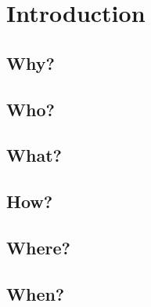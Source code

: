 \chapter{Introduction}
\label{chapter:introduction}

\section{Why?}

\section{Who?}

\section{What?}

\section{How?}

\section{Where?}

\section{When?}
